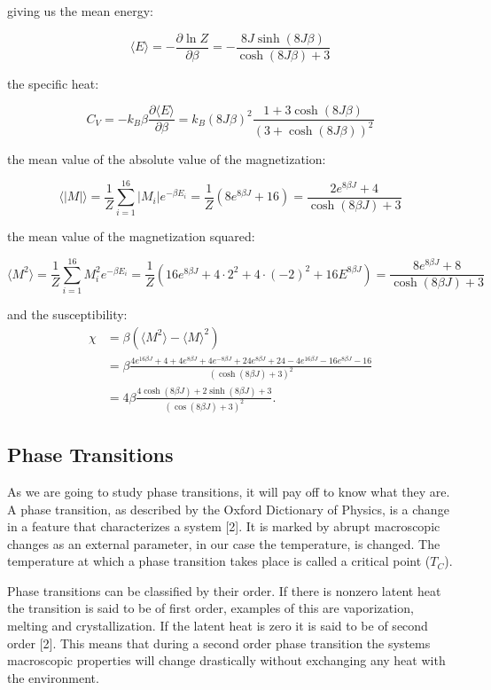 \documentclass[english, 12pt]{article}
\newcommand{\f}{\frac}
\renewcommand{\dd}{\partial}
\begin{document}
giving us the mean energy:

$$\langle E\rangle = -\f{\dd \ln Z}{\dd\beta} = -\f{8J\sinh(8J\beta)}{\cosh(8J\beta) + 3}$$

the specific heat:

$$C_V = -k_B\beta\f{\dd\langle E\rangle}{\dd\beta} = k_B(8J\beta)^2\f{1+3\cosh(8J\beta)}{(3+\cosh(8J\beta))^2}$$

the mean value of the absolute value of the magnetization:

$$\langle|M|\rangle = \f{1}{Z}\sum\limits_{i=1}^{16}|M_i|e^{-\beta E_i} = \f{1}{Z}\left(8e^{8\beta J}+16\right) = \f{2e^{8\beta J}+4}{\cosh(8\beta J)+3}$$

the mean value of the magnetization squared:

$$\langle M ^2\rangle = \f{1}{Z}\sum\limits_{i=1}^{16}M_i^2e^{-\beta E_i} = \f{1}{Z} \left(16e^{8\beta J} + 4\cdot 2^2+4\cdot(-2)^2+16E^{8\beta J}\right) = \f{8e^{8\beta J} + 8}{\cosh(8\beta J) + 3}$$

and the susceptibility:
\begin{align*}
\chi &= \beta(\langle M^2\rangle - \langle M\rangle^2) \\
&= \beta\f{4e^{16\beta J} +4 +4e^{8\beta J} + 4e^{-8\beta J} + 24e^{8\beta J} +24 -4e^{16\beta J} - 16e^{8\beta J}-16}{(\cosh(8\beta J)+3)^2}\\
&= 4\beta \f{4\cosh(8\beta J) + 2\sinh(8\beta J) +3}{(\cos(8\beta J) +3) ^2}.
\end{align*}

\subsection{Phase Transitions}
As we are going to study phase transitions, it will pay off to know what they are. A phase transition, as described by the Oxford Dictionary of Physics, is a change in a feature that characterizes a system [2]. It is marked by abrupt macroscopic changes as an external parameter, in our case the temperature, is changed. The temperature at which a phase transition takes place is called a critical point ($T_C$).

Phase transitions can be classified by their order. If there is nonzero latent heat the transition is said to be of first order, examples of this are vaporization, melting and crystallization. If the latent heat is zero it is said to be of second order [2]. This means that during a second order phase transition the systems macroscopic properties will change drastically without exchanging any heat with the environment.
\end{document}
